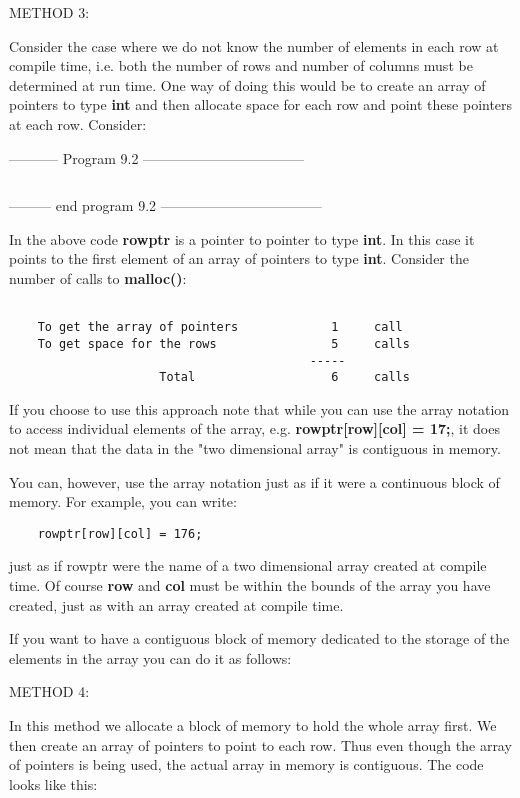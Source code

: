 METHOD 3:

Consider the case where we do not know the number of elements in each
row at compile time, i.e. both the number of rows and number of columns
must be determined at run time. One way of doing this would be to create
an array of pointers to type \textbf{int} and then allocate space for
each row and point these pointers at each row. Consider:

-----------  Program 9.2  -----------------------------------
\inputminted{c}{../src/ch9-2.c}
--------- end program 9.2 -----------------------------------

In the above code \textbf{rowptr} is a pointer to pointer to type
\textbf{int}. In this case it points to the first element of an array of
pointers to type \textbf{int}. Consider the number of calls to
\textbf{malloc()}:

\begin{verbatim}

    To get the array of pointers             1     call
    To get space for the rows                5     calls
                                          -----
                     Total                   6     calls
\end{verbatim}

If you choose to use this approach note that while you can use the array
notation to access individual elements of the array, e.g.
\textbf{rowptr{[}row{]}{[}col{]} = 17;}, it does not mean that the data
in the "two dimensional array" is contiguous in memory.

You can, however, use the array notation just as if it were a continuous
block of memory. For example, you can write:

\begin{verbatim}
    rowptr[row][col] = 176;
\end{verbatim}

just as if rowptr were the name of a two dimensional array created at
compile time. Of course \textbf{row} and \textbf{col} must be within the
bounds of the array you have created, just as with an array created at
compile time.

If you want to have a contiguous block of memory dedicated to the
storage of the elements in the array you can do it as follows:

METHOD 4:

In this method we allocate a block of memory to hold the whole array
first. We then create an array of pointers to point to each row. Thus
even though the array of pointers is being used, the actual array in
memory is contiguous. The code looks like this:

